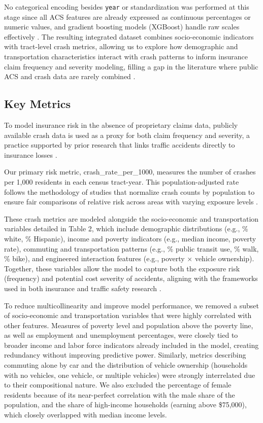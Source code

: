\documentclass[
  number,
  review,
  3p]{elsarticle}
\begin{document}
No categorical encoding besides \texttt{year} or standardization was
performed at this stage since all ACS features are already expressed as
continuous percentages or numeric values, and gradient boosting models
(XGBoost) handle raw scales effectively \citep{henckaerts}. The
resulting integrated dataset combines socio-economic indicators with
tract-level crash metrics, allowing us to explore how demographic and
transportation characteristics interact with crash patterns to inform
insurance claim frequency and severity modeling, filling a gap in the
literature where public ACS and crash data are rarely combined
\citep{mohamed, jonkheijm}.

\subsection{\texorpdfstring{\textbf{Key
Metrics}}{Key Metrics}}\label{key-metrics}

To model insurance risk in the absence of proprietary claims data,
publicly available crash data is used as a proxy for both claim
frequency and severity, a practice supported by prior research that
links traffic accidents directly to insurance losses
\citep{adeniyi, dong}.

Our primary risk metric, crash\_rate\_per\_1000, measures the number of
crashes per 1,000 residents in each census tract-year. This
population-adjusted rate follows the methodology of studies that
normalize crash counts by population to ensure fair comparisons of
relative risk across areas with varying exposure levels
\citep{brubacher, cabrera}.

These crash metrics are modeled alongside the socio-economic and
transportation variables detailed in Table 2, which include demographic
distributions (e.g., \% white, \% Hispanic), income and poverty
indicators (e.g., median income, poverty rate), commuting and
transportation patterns (e.g., \% public transit use, \% walk, \% bike),
and engineered interaction features (e.g., poverty × vehicle ownership).
Together, these variables allow the model to capture both the exposure
risk (frequency) and potential cost severity of accidents, aligning with
the frameworks used in both insurance \citep{clemente, henckaerts} and
traffic safety research \citep{dong}.

To reduce multicollinearity and improve model performance, we removed a
subset of socio-economic and transportation variables that were highly
correlated with other features. Measures of poverty level and population
above the poverty line, as well as employment and unemployment
percentages, were closely tied to broader income and labor force
indicators already included in the model, creating redundancy without
improving predictive power. Similarly, metrics describing commuting
alone by car and the distribution of vehicle ownership (households with
no vehicles, one vehicle, or multiple vehicles) were strongly
interrelated due to their compositional nature. We also excluded the
percentage of female residents because of its near-perfect correlation
with the male share of the population, and the share of high-income
households (earning above \$75,000), which closely overlapped with
median income levels.
\end{document}

